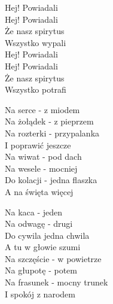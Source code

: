 \begin{text}
    \vin Hej! Powiadali\\
    \vin Hej! Powiadali\\
    \vin Że nasz spirytus\\
    \vin Wszystko wypali\\
    \vin Hej! Powiadali\\
    \vin Hej! Powiadali\\
    \vin Że nasz spirytus\\
    \vin Wszystko potrafi

    Na serce - z miodem\\
    Na żołądek - z pieprzem\\
    Na rozterki - przypalanka\\
    I poprawić jeszcze\\
    Na wiwat - pod dach\\
    Na wesele - mocniej\\
    Do kolacji - jedna flaszka\\
    A na święta więcej

    Na kaca - jeden\\
    Na odwagę - drugi\\
    Do cywila jedna chwila\\
    A tu w głowie szumi\\
    Na szczęście - w powietrze\\
    Na głupotę - potem\\
    Na frasunek - mocny trunek\\
    I spokój z narodem
\end{text}
\begin{chord}

\end{chord}